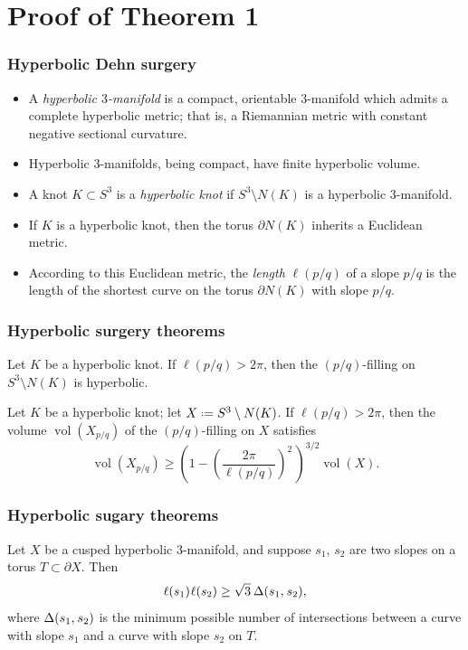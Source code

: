 \documentclass{beamer}
\newcommand{\vol}{\operatorname{vol}}
\newcommand{\defeq}{\mathrel{\vcenter{\baselineskip0.5ex\lineskiplimit0pt\hbox{\scriptsize.}\hbox{\scriptsize.}}}=}
\newcommand{\hs}{\hspace{0.05em}} %
\theoremstyle{ex}
\theoremstyle{rem}
\begin{document}
\section{Proof of Theorem 1}
	
	\begin{frame}
		\frametitle{Hyperbolic Dehn surgery}
		\begin{itemize}
			\item A \textit{hyperbolic $3$-manifold} is a compact, orientable $3$-manifold which admits a complete hyperbolic metric; that is, a Riemannian metric with constant negative sectional curvature.
			\pause
			\item Hyperbolic $3$-manifolds, being compact, have finite hyperbolic volume.
			\pause
			\item A knot $K\subset S^3$ is a \textit{hyperbolic knot} if $S^3\setminus N(K)$ is a hyperbolic $3$-manifold.
			\pause
			\item If $K$ is a hyperbolic knot, then the torus $\partial N(K)$ inherits a Euclidean metric.
			\pause
			\item According to this Euclidean metric, the \textit{length} $\ell(p/q)$ of a slope $p/q$ is the length of the shortest curve on the torus $\partial N(K)$ with slope $p/q$.
		\end{itemize}
	\end{frame}
	
	\begin{frame}
		\frametitle{Hyperbolic surgery theorems}
		\begin{theorem}
			Let $K$ be a hyperbolic knot. If $\ell(p/q)>2\pi$, then the $(p/q)$-filling on $S^3\setminus N(K)$ is hyperbolic.
		\end{theorem}
		\pause
		\begin{theorem}[Futer, et al.]
			Let $K$ be a hyperbolic knot; let $X\defeq S^3\setminus N(K)$. If $\ell(p/q)>2\pi$, then the volume $\vol(X_{p/q})$ of the $(p/q)$-filling on $X$ satisfies
			\[\vol(X_{p/q})\ge\left(1-\left(\frac{2\pi}{\ell(p/q)}\right)^2\,\right)^{3/2}\vol(X).\]
		\end{theorem}
	\end{frame}
	
	\begin{frame}
		\frametitle{Hyperbolic sugary theorems}
		\begin{theorem}
			Let $X$ be a cusped hyperbolic $3$-manifold, and suppose $s_1$, $s_2$ are two slopes on a torus $T\subset \partial X$. Then
			\[\ell(s_1)\hs\ell(s_2)\ge\sqrt{3}\hspace{0.2em}\Delta(s_1,\hs s_2),\]
			where $\Delta(s_1,\hs s_2)$ is the minimum possible number of intersections between a curve with slope $s_1$ and a curve with slope $s_2$ on $T$.
		\end{theorem}
	\end{frame}
	
\end{document}
